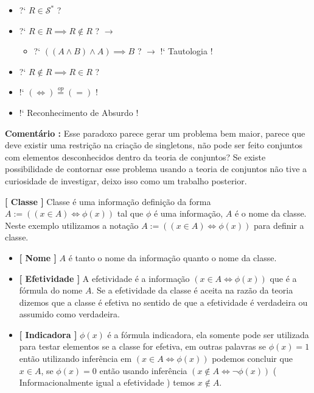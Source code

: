 \documentclass[10pt,a4paper]{report}
\begin{document}
\begin{itemize}
	\item[ ] ?` $R \in \mathcal{S}^*$ ?
	\item[ ] ?` $ R \in R \implies R \notin R $ ? $\rightarrow$
	\begin{itemize}
		\item[ ] ?` $ ( (A \wedge B) \wedge A ) \implies B $ ? $\rightarrow$ !` Tautologia !
	\end{itemize}
	\item[ ] ?` $ R \notin R \implies R \in R $ ?
	\item[ ] !` $ (\iff) \overset{op}{=} (=) $ !
	\item[ ] !` Reconhecimento de Absurdo !
\end{itemize}

\textbf{Comentário :} Esse paradoxo parece gerar um problema bem maior, parece que deve existir uma restrição na criação de singletons, não pode ser feito conjuntos com elementos desconhecidos dentro da teoria de conjuntos? Se existe possibilidade de contornar esse problema usando a teoria de conjuntos não tive a curiosidade de investigar, deixo isso como um trabalho posterior.

\hspace{\baselineskip}

\textbf{[ Classe ]} Classe é uma informação definição da forma $ A := ( (x \in A) \iff \phi(x) )$ tal que $\phi$ é uma informação, $A$ é o nome da classe. Neste exemplo utilizamos a notação $A:=( (x \in A) \iff \phi(x) )$ para definir a classe.

\begin{itemize}
	\item[ (i) ] \textbf{[ Nome ]} $A$ é tanto o nome da informação quanto o nome da classe.
	\item[ (ii) ] \textbf{[ Efetividade ]} A efetividade é a informação $ (x \in A \iff \phi(x)) $ que é a fórmula do nome $A$. Se a efetividade da classe é aceita na razão da teoria dizemos que a classe é efetiva no sentido de que a efetividade é verdadeira ou assumido como verdadeira.
	\item[ (iii) ] \textbf{[ Indicadora ]} $ \phi(x) $ é a fórmula indicadora, ela somente pode ser utilizada para testar elementos se a classe for efetiva, em outras palavras se $ \phi(x) = 1 $ então utilizando inferência em $ (x \in A \iff \phi(x)) $ podemos concluir que $ x \in A $, se $\phi(x) = 0$ então usando inferência $ (x \notin A \iff \neg \phi(x)) $ ( Informacionalmente igual a efetividade ) temos $ x \notin A $.
\end{itemize}
\end{document}
